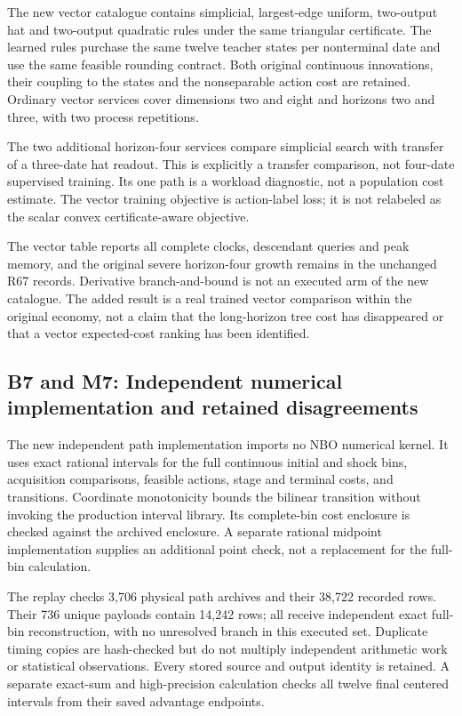 The new vector catalogue contains simplicial, largest-edge uniform,
two-output hat and two-output quadratic rules under the same triangular
certificate. The learned rules purchase the same twelve teacher states
per nonterminal date and use the same feasible rounding contract. Both
original continuous innovations, their coupling to the states and the
nonseparable action cost are retained. Ordinary vector services cover
dimensions two and eight and horizons two and three, with two process
repetitions.

The two additional horizon-four services compare simplicial search with
transfer of a three-date hat readout. This is explicitly a transfer
comparison, not four-date supervised training. Its one path is a
workload diagnostic, not a population cost estimate. The vector training
objective is action-label loss; it is not relabeled as the scalar convex
certificate-aware objective.

The vector table reports all complete clocks, descendant queries and
peak memory, and the original severe horizon-four growth remains in the
unchanged R67 records. Derivative branch-and-bound is not an executed
arm of the new catalogue. The added result is a real trained vector
comparison within the original economy, not a claim that the
long-horizon tree cost has disappeared or that a vector expected-cost
ranking has been identified.

\hypertarget{b7-and-m7-independent-numerical-implementation-and-retained-disagreements}{%
\subsection{B7 and M7: Independent numerical implementation and retained
disagreements}\label{b7-and-m7-independent-numerical-implementation-and-retained-disagreements}}

The new independent path implementation imports no NBO numerical kernel.
It uses exact rational intervals for the full continuous initial and
shock bins, acquisition comparisons, feasible actions, stage and
terminal costs, and transitions. Coordinate monotonicity bounds the
bilinear transition without invoking the production interval library.
Its complete-bin cost enclosure is checked against the archived
enclosure. A separate rational midpoint implementation supplies an
additional point check, not a replacement for the full-bin calculation.

The replay checks 3,706 physical path archives and their 38,722 recorded
rows. Their 736 unique payloads contain 14,242 rows; all receive
independent exact full-bin reconstruction, with no unresolved branch in
this executed set. Duplicate timing copies are hash-checked but do not
multiply independent arithmetic work or statistical observations. Every
stored source and output identity is retained. A separate exact-sum and
high-precision calculation checks all twelve final centered intervals
from their saved advantage endpoints.

